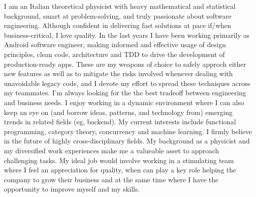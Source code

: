 
\begin{cvparagraph}
I am an Italian theoretical physicist with heavy mathematical and statistical 
background, smart at problem-solving, and truly passionate about software engineering. 
Although  
confident in
delivering 
fast solutions at pace
if/when
business-critical, I love quality. 
In the last years I have been working primarily as Android software engineer,  
	making informed and effective usage of design principles, clean code, architecture and TDD to drive the development of production-ready apps.
These are my weapons of choice to safely approch either new features as well as to mitigate the risks involved whenever dealing with unavoidable legacy code, and I devote my effort to spread these techniques across my teammates. 
I'm always looking for the the best tradeoff between engineering and business needs. 
I enjoy  working in a dynamic
environment 
 where I can also keep an eye on (and borrow ideas, patterns, and technology from) emerging trends in related
	fields (eg, backend).
	My current interests include functional programming, category theory, concurrency and machine learning. 
 I firmly
believe in the future of highly cross-disciplinary fields.
My background as a physicist and my diversified work experiences make me a valueable asset to approach challenging tasks. 
My ideal job would involve working in a stimulating team where I feel an appreciation for quality, when 
can play a key role helping the company to grow their business and at the same time
where I have the opportunity to improve myself and my skills.
\end{cvparagraph}
